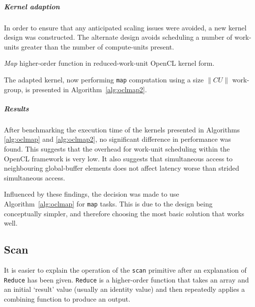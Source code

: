 \subparagraph*{Kernel adaption}
In order to ensure that any anticipated scaling issues were avoided, a new kernel design was constructed. The alternate design avoids scheduling a number of work-units greater than the number of compute-units present.

\begin{algorithm}
  \caption{\emph{Map} higher-order function in reduced-work-unit OpenCL kernel form.}
  \label{alg:oclmap2}

  \begin{algorithmic}


      \EndFor
    \EndFunction
  \end{algorithmic}
\end{algorithm}

The adapted kernel, now performing \verb|map| computation using a size $\|CU\|$ work-group, is presented in Algorithm~\ref{alg:oclmap2}.

\subparagraph*{Results}
After benchmarking the execution time of the kernels presented in Algorithms \ref{alg:oclmap} and \ref{alg:oclmap2}, no significant difference in performance was found. This suggests that the overhead for work-unit scheduling within the \ac{OpenCL} framework is very low. It also suggests that simultaneous access to neighbouring global-buffer elements does not affect latency worse than strided simultaneous access.

Influenced by these findings, the decision was made to use Algorithm~\ref{alg:oclmap} for \verb|map| tasks. This is due to the design being conceptually simpler, and therefore choosing the most basic solution that works well.

\subsection{Scan}
It is easier to explain the operation of the \verb|scan| primitive after an explanation of \verb|Reduce| has been given.
\verb|Reduce| is a higher-order function that takes an array and an initial `result' value (usually an identity value) and then repeatedly applies a combining function to produce an output.

